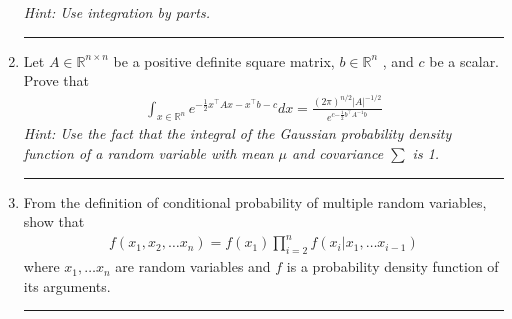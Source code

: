 \documentclass[12pt]{article}
\begin{document}
\begin{enumerate}
    \textit{Hint: Use integration by parts. }

    \noindent\rule{\linewidth}{1pt}
    \item Let $A \in \mathbb{R}^{n \times n}$ be a positive definite square matrix, $b \in \mathbb{R}^n$ , and $c$ be a scalar. Prove that
    \begin{align*}  
        \int_{x \in \mathbb{R}^n} e^{-\frac{1}{2} x^\intercal Ax-x^\intercal b-c } dx = \frac{(2\pi)^{n/2} |A|^{-1/2} }{e^{c{-\frac{1}{2}b^\intercal A^{-1} b}}}
    \end{align*}
    \textit{Hint: Use the fact that the integral of the Gaussian probability density function of a random variable with mean $\mu$ and covariance $\sum$ is 1.}
    
    \noindent\rule{\linewidth}{1pt}
    \item From the definition of conditional probability of multiple random variables, show that 
    \begin{align*}
        f(x_1,x_2, \dots x_n) = f(x_1) \prod_{i=2}^{n} f(x_i | x_1, \dots x_{i-1})
    \end{align*}
    where $x_1, \dots x_n$ are random variables and $f$ is a probability density function of its arguments. 

    \noindent\rule{\linewidth}{1pt}
\end{enumerate}
\end{document}
